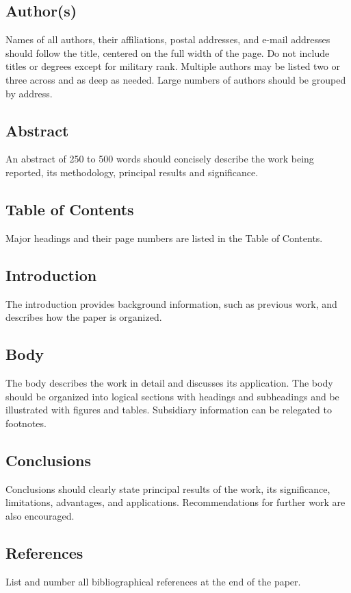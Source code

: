 \documentclass[twocolumn,letterpaper]{IEEEAerospaceCLS}  %
\begin{document}
\subsection{Author(s)}
Names of all authors, their affiliations, postal addresses, and e-mail addresses should follow the title, centered on the full width of the page. Do not include titles or degrees except for military rank. Multiple authors may be listed two or three across and as deep as needed. Large numbers of authors should be grouped by address.

\subsection{Abstract}
An abstract of 250 to 500 words should concisely describe the work being reported, its methodology, principal results and significance.

\subsection{Table of Contents}
Major headings and their page numbers are listed in the Table of Contents.

\subsection{Introduction}
The introduction provides background information, such as previous work, and describes how the paper is organized.

\subsection{Body}
The body describes the work in detail and discusses its application. The body should be organized into logical sections with headings and subheadings and be illustrated with figures and tables. Subsidiary information can be relegated to footnotes.

\subsection{Conclusions}
Conclusions should clearly state principal results of the work, its significance, limitations, advantages, and applications. Recommendations for further work are also encouraged.

\subsection{References}
List and number all bibliographical references at the end of the paper.
\end{document}

